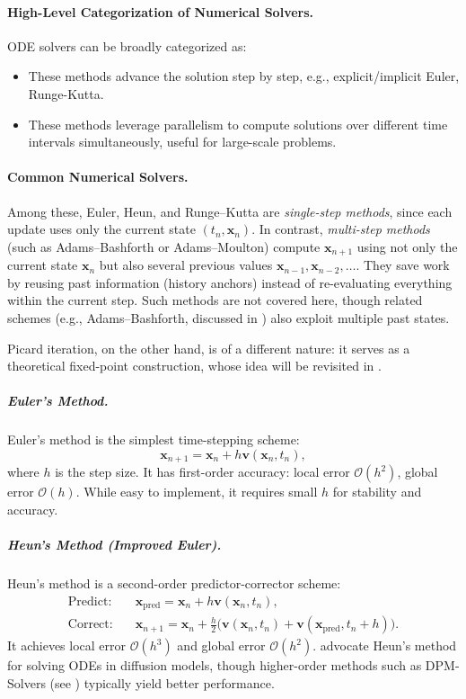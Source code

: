 \paragraph{High-Level Categorization of Numerical Solvers.}
ODE solvers can be broadly categorized as:
\begin{itemize}
    \item {} These methods advance the solution step by step, e.g., explicit/implicit Euler, Runge-Kutta.
    \item {} These methods leverage parallelism to compute solutions over different time intervals simultaneously, useful for large-scale problems.
\end{itemize}

\paragraph{Common Numerical Solvers.} Among these, Euler, Heun, and Runge--Kutta are \emph{single-step methods}, since 
each update uses only the current state $(t_n,\mathbf{x}_n)$. 
In contrast, \emph{multi-step methods} (such as Adams--Bashforth or Adams--Moulton) 
compute $\mathbf{x}_{n+1}$ using not only the current state $\mathbf{x}_n$ but also 
several previous values $\mathbf{x}_{n-1}, \mathbf{x}_{n-2}, \dots$. 
They save work by reusing past information (history anchors) instead of re-evaluating 
everything within the current step. 
Such methods are not covered here, though related schemes (e.g., Adams--Bashforth, 
discussed in ) also exploit multiple past states. 

Picard iteration, on the other hand, is of a different nature: it serves as a 
theoretical fixed-point construction, whose idea will be revisited in 
.


\subparagraph{Euler's Method.}
Euler's method is the simplest time-stepping scheme:
\[
\mathbf{x}_{n+1} = \mathbf{x}_n + h \mathbf{v}(\mathbf{x}_n, t_n),
\]
where $h$ is the step size. It has first-order accuracy: local error $\mathcal{O}(h^2)$, global error $\mathcal{O}(h)$. While easy to implement, it requires small $h$ for stability and accuracy.

\subparagraph{Heun's Method (Improved Euler).}
Heun's method is a second-order predictor-corrector scheme:
\begin{align*}
\text{Predict:} \quad &\mathbf{x}_{\text{pred}} = \mathbf{x}_n + h \mathbf{v}(\mathbf{x}_n, t_n), \\
\text{Correct:} \quad &\mathbf{x}_{n+1} = \mathbf{x}_n + \frac{h}{2} \big(\mathbf{v}(\mathbf{x}_n, t_n) + \mathbf{v}(\mathbf{x}_{\text{pred}}, t_n + h)\big).
\end{align*}
It achieves local error $\mathcal{O}(h^3)$ and global error $\mathcal{O}(h^2)$. \citet{karras2022elucidating} advocate Heun's method for solving ODEs in diffusion models, though higher-order methods such as DPM-Solvers (see ) typically yield better performance.

